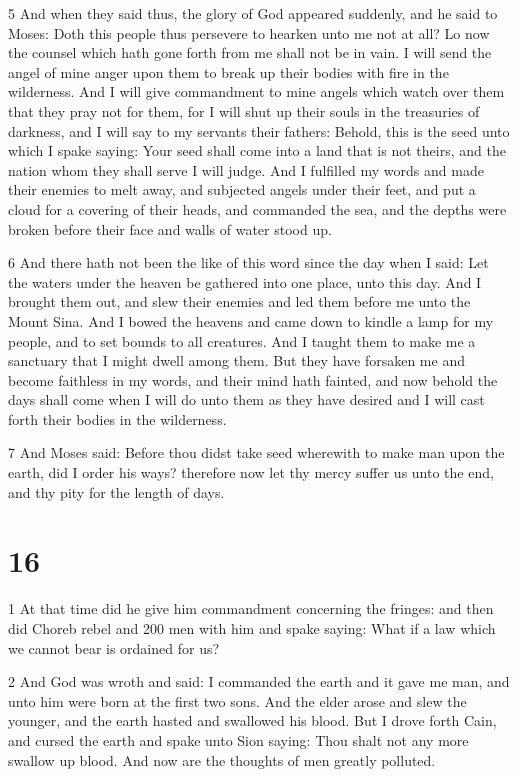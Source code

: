 \par 5 And when they said thus, the glory of God appeared suddenly, and he said to Moses: Doth this people thus persevere to hearken unto me not at all? Lo now the counsel which hath gone forth from me shall not be in vain. I will send the angel of mine anger upon them to break up their bodies with fire in the wilderness. And I will give commandment to mine angels which watch over them that they pray not for them, for I will shut up their souls in the treasuries of darkness, and I will say to my servants their fathers: Behold, this is the seed unto which I spake saying: Your seed shall come into a land that is not theirs, and the nation whom they shall serve I will judge. And I fulfilled my words and made their enemies to melt away, and subjected angels under their feet, and put a cloud for a covering of their heads, and commanded the sea, and the depths were broken before their face and walls of water stood up. 

\par 6 And there hath not been the like of this word since the day when I said: Let the waters under the heaven be gathered into one place, unto this day. And I brought them out, and slew their enemies and led them before me unto the Mount Sina. And I bowed the heavens and came down to kindle a lamp for my people, and to set bounds to all creatures. And I taught them to make me a sanctuary that I might dwell among them. But they have forsaken me and become faithless in my words, and their mind hath fainted, and now behold the days shall come when I will do unto them as they have desired and I will cast forth their bodies in the wilderness. 

\par 7 And Moses said: Before thou didst take seed wherewith to make man upon the earth, did I order his ways? therefore now let thy mercy suffer us unto the end, and thy pity for the length of days.

\chapter{16}

\par 1 At that time did he give him commandment concerning the fringes: and then did Choreb rebel and 200 men with him and spake saying: What if a law which we cannot bear is ordained for us? 

\par 2 And God was wroth and said: I commanded the earth and it gave me man, and unto him were born at the first two sons. And the elder arose and slew the younger, and the earth hasted and swallowed his blood. But I drove forth Cain, and cursed the earth and spake unto Sion saying: Thou shalt not any more swallow up blood. And now are the thoughts of men greatly polluted. 

